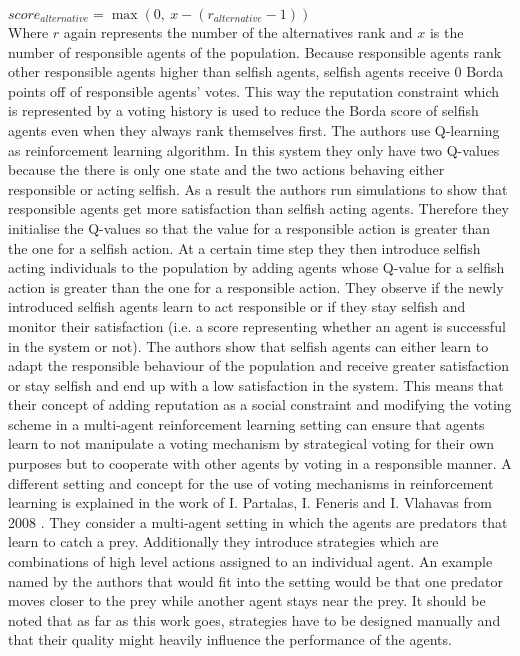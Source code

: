 \documentclass[conference]{IEEEtran}
\begin{document}
$score_{alternative}=\max(0,\ x-(r_{alternative}-1))$\\
Where $r$ again represents the number of the alternatives rank and $x$ is the number of responsible agents of the population. Because responsible agents rank other responsible agents higher than selfish agents, selfish agents receive $0$ Borda points off of responsible agents' votes. This way the reputation constraint which is represented by a voting history is used to reduce the Borda score of selfish agents even when they always rank themselves first.
\newline
The authors use Q-learning as reinforcement learning algorithm. In this system they only have two Q-values because the there is only one state and the two actions behaving either responsible or acting selfish.
As a result the authors run simulations to show that responsible agents get more satisfaction than selfish acting agents. Therefore they initialise the Q-values so that the value for a responsible action is greater than the one for a selfish action. At a certain time step they then introduce selfish acting individuals to the population by adding agents whose Q-value for a selfish action is greater than the one for a responsible action. They observe if the newly introduced selfish agents learn to act responsible or if they stay selfish and monitor their satisfaction (i.e. a score representing whether an agent is successful in the system or not).
\newline
The authors show that selfish agents can either learn to adapt the responsible behaviour of the population and receive greater satisfaction or stay selfish and end up with a low satisfaction in the system. This means that their concept of adding reputation as a social constraint and modifying the voting scheme in a multi-agent reinforcement learning setting can ensure that agents learn to not manipulate a voting mechanism by strategical voting for their own purposes but to cooperate with other agents by voting in a responsible manner.
\newline
\newline
A different setting and concept for the use of voting mechanisms in reinforcement learning is explained in the work of I. Partalas, I. Feneris and I. Vlahavas from 2008 \cite{partalas2008hybrid}. They consider a multi-agent setting in which the agents are predators that learn to catch a prey.
\newline
Additionally they introduce strategies which are combinations of high level actions assigned to an individual agent. An example named by the authors that would fit into the setting would be that one predator moves closer to the prey while another agent stays near the prey. It should be noted that as far as this work goes, strategies have to be designed manually and that their quality might heavily influence the performance of the agents.
\end{document}
